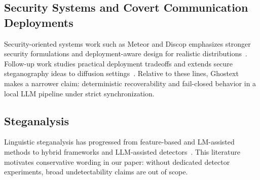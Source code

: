 \subsection{Security Systems and Covert Communication Deployments}
Security-oriented systems work such as Meteor and Discop emphasizes stronger security formulations and deployment-aware design for realistic distributions~\cite{DBLP:conf/ccs/KaptchukJ0R21,DBLP:conf/sp/DingCWZZY23}. Follow-up work studies practical deployment tradeoffs and extends secure steganography ideas to diffusion settings~\cite{DBLP:conf/codaspy/BauerHMBS24,DBLP:conf/ccs/JoisBK24}. Relative to these lines, Ghostext makes a narrower claim: deterministic recoverability and fail-closed behavior in a local LLM pipeline under strict synchronization.

\subsection{Steganalysis}
Linguistic steganalysis has progressed from feature-based and LM-assisted methods to hybrid frameworks and LLM-assisted detectors~\cite{DBLP:conf/icassp/YiWFZ22,DBLP:journals/spl/GuoLYYZ22,DBLP:conf/icassp/YangYGZGH23,DBLP:journals/corr/abs-2405-09090}. This literature motivates conservative wording in our paper: without dedicated detector experiments, broad undetectability claims are out of scope.
